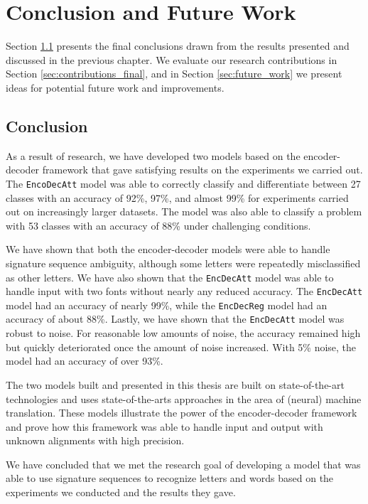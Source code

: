 
\chapter{Conclusion and Future Work}
\label{ch:conclusion}
Section \ref{sec:conclusion} presents the final conclusions drawn from the results presented and discussed in the previous chapter. We evaluate our research contributions in Section \ref{sec:contributions_final}, and in Section \ref{sec:future_work} we present ideas for potential future work and improvements.

\section{Conclusion}
\label{sec:conclusion}
As a result of research, we have developed two models based on the encoder-decoder framework that gave satisfying results on the experiments we carried out. The {\tt EncoDecAtt} model was able to correctly classify and differentiate between 27 classes with an accuracy of 92\%, 97\%, and almost 99\% for experiments carried out on increasingly larger datasets. The model was also able to classify a problem with 53 classes with an accuracy of 88\% under challenging conditions.

We have shown that both the encoder-decoder models were able to handle signature sequence ambiguity, although some letters were repeatedly misclassified as other letters. We have also shown that the {\tt EncDecAtt} model was able to handle input with two fonts without nearly any reduced accuracy. The {\tt EncDecAtt} model had an accuracy of nearly 99\%, while the {\tt EncDecReg} model had an accuracy of about 88\%. Lastly, we have shown that the {\tt EncDecAtt} model was robust to noise. For reasonable low amounts of noise, the accuracy remained high but quickly deteriorated once the amount of noise increased. With 5\% noise, the model had an accuracy of over 93\%.

The two models built and presented in this thesis are built on state-of-the-art technologies and uses state-of-the-arts approaches in the area of (neural) machine translation. These models illustrate the power of the encoder-decoder framework and prove how this framework was able to handle input and output with unknown alignments with high precision.

We have concluded that we met the research goal of developing a model that was able to use signature sequences to recognize letters and words based on the experiments we conducted and the results they gave.

